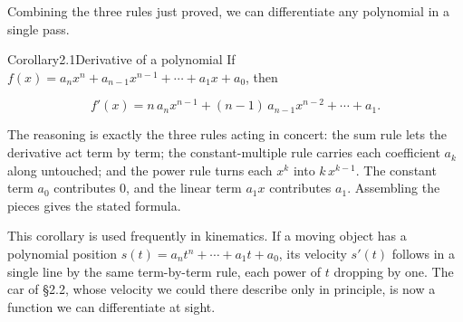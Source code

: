 \documentclass[a4paper,12pt,oneside]{memoir}
\begin{document}
Combining the three rules just proved, we can differentiate any polynomial in a single pass.

\begin{envcorollary}{Corollary}{2.1}{Derivative of a polynomial}
If \(f(x) = a_{n}x^{n} + a_{n-1}x^{n-1} + \cdots + a_{1}x + a_{0}\), then

\[ f'(x) = n\,a_{n}x^{n-1} + (n-1)\,a_{n-1}x^{n-2} + \cdots + a_{1}. \]
\end{envcorollary}
The reasoning is exactly the three rules acting in concert: the sum rule lets the derivative act term by term; the constant-multiple rule carries each coefficient \(a_{k}\) along untouched; and the power rule turns each \(x^{k}\) into \(k\,x^{k-1}\). The constant term \(a_{0}\) contributes \(0\), and the linear term \(a_{1}x\) contributes \(a_{1}\). Assembling the pieces gives the stated formula.

This corollary is used frequently in kinematics. If a moving object has a polynomial position \(s(t) = a_{n}t^{n} + \cdots + a_{1}t + a_{0}\), its velocity \(s'(t)\) follows in a single line by the same term-by-term rule, each power of \(t\) dropping by one. The car of §2.2, whose velocity we could there describe only in principle, is now a function we can differentiate at sight.
\end{document}

